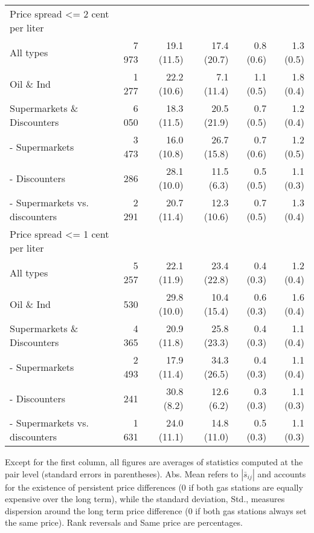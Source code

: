 \documentclass[english]{article}
\begin{document}
\begin{table}[htb!]
\begin{threeparttable}
\begin{tabular}{lrrrrr}
    \midrule
    Price spread <= 2 cent per liter &       &       &       &       &  \\
    All types & 7 973 & 19.1 (11.5) & 17.4 (20.7) & 0.8 (0.6) & 1.3 (0.5) \\
    Oil \& Ind & 1 277 & 22.2 (10.6) & 7.1 (11.4) & 1.1 (0.5) & 1.8 (0.4) \\
    Supermarkets \& Discounters & 6 050 & 18.3 (11.5) & 20.5 (21.9) & 0.7 (0.5) & 1.2 (0.4) \\
    \hspace*{4mm} - Supermarkets & 3 473 & 16.0 (10.8) & 26.7 (15.8) & 0.7 (0.6) & 1.2 (0.5) \\
    \hspace*{4mm} - Discounters & 286   & 28.1 (10.0) & 11.5 \phantom{0}(6.3) & 0.5 (0.5) & 1.1 (0.3) \\
    \hspace*{4mm} - Supermarkets vs. discounters & 2 291 & 20.7 (11.4) & 12.3 (10.6) & 0.7 (0.5) & 1.3 (0.4) \\
    \midrule
    Price spread <= 1 cent per liter &       &       &       &       &  \\
    All types & 5 257 & 22.1 (11.9) & 23.4 (22.8) & 0.4 (0.3) & 1.2 (0.4) \\
    Oil \& Ind & 530   & 29.8 (10.0) & 10.4 (15.4) & 0.6 (0.3) & 1.6 (0.4) \\
    Supermarkets \& Discounters & 4 365 & 20.9 (11.8) & 25.8 (23.3) & 0.4 (0.3) & 1.1 (0.4) \\
    \hspace*{4mm} - Supermarkets & 2 493 & 17.9 (11.4) & 34.3 (26.5) & 0.4 (0.3) & 1.1 (0.4) \\
    \hspace*{4mm} - Discounters & 241   & 30.8 \phantom{0}(8.2) & 12.6 \phantom{0}(6.2) & 0.3 (0.3) & 1.1 (0.3) \\
    \hspace*{4mm} - Supermarkets vs. discounters & 1 631 & 24.0 (11.1) & 14.8 (11.0) & 0.5 (0.3) & 1.1 (0.3) \\
    \bottomrule
    \bottomrule
\end{tabular}
\begin{tablenotes}
			\small
      \item Except for the first column, all figures are averages of statistics computed at the pair level (standard errors in parentheses). Abs. Mean refers to $|\bar{s}_{ij}|$ and accounts for the existence of persistent price differences (0 if both gas stations are equally expensive over the long term), while the standard deviation, Std., measures dispersion around the long term price difference (0 if both gas stations always set the same price). Rank reversals and Same price are percentages.
\end{tablenotes}
\end{threeparttable}
\end{table}
\end{document}
